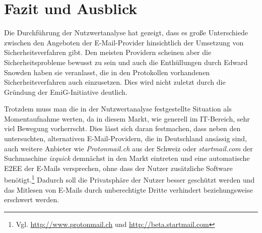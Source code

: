 \documentclass  [paper=a4,
				fontsize=12pt,
				listof=totoc,
				bibliography=totoc
				]{scrreprt}
\begin{document}
%			
%			
%			
				
			
	\chapter{Fazit und Ausblick}
		\color{black}
		Die Durchführung der Nutzwertanalyse hat gezeigt, dass es große Unterschiede zwischen den Angeboten der E-Mail-Provider hinsichtlich der Umsetzung von Sicherheitsverfahren gibt.
		Den meisten Providern scheinen aber die Sicherheitsprobleme bewusst zu sein und auch die Enthüllungen durch Edward Snowden haben sie veranlasst, die in den Protokollen vorhandenen Sicherheitsverfahren auch einzusetzen.
		Dies wird nicht zuletzt durch die Gründung der \ac{EmiG}-Initiative deutlich.\medskip
		
		Trotzdem muss man die in der Nutzwertanalyse festgestellte Situation als Momentaufnahme werten, da in diesem Markt, wie generell im IT-Bereich, sehr viel Bewegung vorherrscht.
		Dies lässt sich daran festmachen, dass neben den untersuchten, alternativen E-Mail-Providern, die in Deutschland ansässig sind, auch weitere Anbieter wie \textit{Protonmail.ch} aus der Schweiz oder \textit{startmail.com} der Suchmaschine \textit{ixquick} demnächst in den Markt eintreten und eine automatische \ac{E2EE} der E-Mails versprechen, ohne dass der Nutzer zusätzliche Software benötigt.\footnote{Vgl. \url{http://www.protonmail.ch} und \url{http://beta.startmail.com}}
		Dadurch soll die Privatsphäre der Nutzer besser geschützt werden und das Mitlesen von E-Mails durch unberechtigte Dritte verhindert beziehungsweise erschwert werden.\medskip\\
		
\end{document}
